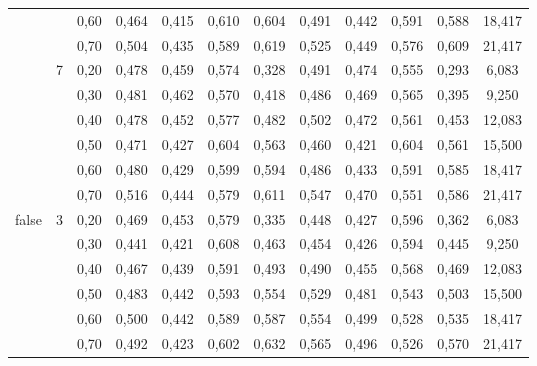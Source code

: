 \begin{table}[!h]
\begin{tabular}{|c|c|c||c|c|c|c||c|c|c|c||c|}
	 && 0,60    & 0,464 & 0,415 & 0,610 & 0,604         &     0,491 &  0,442 & 0,591 & 0,588 & 18,417              \\ \cline{3-12}                  
	 && 0,70    & 0,504 & 0,435 & 0,589 & 0,619         &     0,525 &  0,449 & 0,576 & 0,609 & 21,417              \\ \cline{2-12}                  
 & \multirow{6}{*}{7}                                                                                                                               
	  & 0,20    & 0,478 & 0,459 & 0,574 & 0,328         &     0,491 &  0,474 & 0,555 & 0,293 & 6,083               \\ \cline{3-12}                  
	 && 0,30    & 0,481 & 0,462 & 0,570 & 0,418         &     0,486 &  0,469 & 0,565 & 0,395 & 9,250               \\ \cline{3-12}                  
	 && 0,40    & 0,478 & 0,452 & 0,577 & 0,482         &     0,502 &  0,472 & 0,561 & 0,453 & 12,083              \\ \cline{3-12}                  
	 && 0,50    & 0,471 & 0,427 & 0,604 & 0,563         &     0,460 &  0,421 & 0,604 & 0,561 & 15,500              \\ \cline{3-12}                  
	 && 0,60    & 0,480 & 0,429 & 0,599 & 0,594         &     0,486 &  0,433 & 0,591 & 0,585 & 18,417              \\ \cline{3-12}                  
	 && 0,70    & 0,516 & 0,444 & 0,579 & 0,611         &     0,547 &  0,470 & 0,551 & 0,586 & 21,417              \\ \hline                       
\multirow{18}{*}{false} & \multirow{6}{*}{3} 
	  & 0,20    & 0,469 & 0,453 & 0,579 & 0,335         &     0,448 &  0,427 & 0,596 & 0,362 & 6,083               \\ \cline{3-12}  
	 && 0,30    & 0,441 & 0,421 & 0,608 & 0,463         &     0,454 &  0,426 & 0,594 & 0,445 & 9,250               \\ \cline{3-12}  
	 && 0,40    & 0,467 & 0,439 & 0,591 & 0,493         &     0,490 &  0,455 & 0,568 & 0,469 & 12,083              \\ \cline{3-12}  
	 && 0,50    & 0,483 & 0,442 & 0,593 & 0,554         &     0,529 &  0,481 & 0,543 & 0,503 & 15,500              \\ \cline{3-12}  
	 && 0,60    & 0,500 & 0,442 & 0,589 & 0,587         &     0,554 &  0,499 & 0,528 & 0,535 & 18,417              \\ \cline{3-12}  
	 && 0,70    & 0,492 & 0,423 & 0,602 & 0,632         &     0,565 &  0,496 & 0,526 & 0,570 & 21,417              \\ \cline{2-12}  

\end{tabular}
\end{table}
